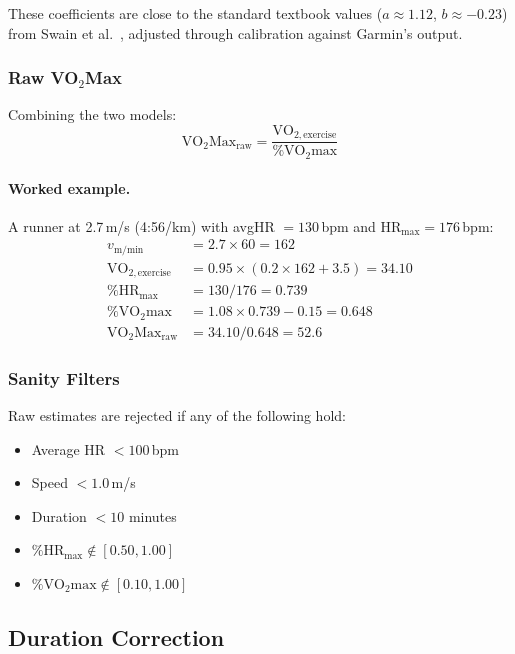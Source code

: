 \documentclass[11pt,a4paper]{article}
\begin{document}
These coefficients are close to the standard textbook values ($a \approx 1.12$, $b \approx -0.23$) from Swain et al.~\cite{swain1994}, adjusted through calibration against Garmin's output.

\subsubsection{Raw VO$_2$Max}

Combining the two models:
\begin{equation}
\text{VO}_2\text{Max}_{\text{raw}} = \frac{\text{VO}_{2,\text{exercise}}}{\%\text{VO}_2\text{max}}
\label{eq:raw-vo2max}
\end{equation}

\paragraph{Worked example.}
A runner at 2.7\,m/s (4:56/km) with avgHR $= 130$\,bpm and HR$_{\text{max}} = 176$\,bpm:
\begin{align*}
v_{\text{m/min}} &= 2.7 \times 60 = 162 \\
\text{VO}_{2,\text{exercise}} &= 0.95 \times (0.2 \times 162 + 3.5) = 34.10 \\
\%\text{HR}_{\text{max}} &= 130 / 176 = 0.739 \\
\%\text{VO}_2\text{max} &= 1.08 \times 0.739 - 0.15 = 0.648 \\
\text{VO}_2\text{Max}_{\text{raw}} &= 34.10 / 0.648 = 52.6
\end{align*}

\subsubsection{Sanity Filters}

Raw estimates are rejected if any of the following hold:
\begin{itemize}[nosep]
    \item Average HR $< 100$\,bpm
    \item Speed $< 1.0$\,m/s
    \item Duration $< 10$ minutes
    \item $\%\text{HR}_{\text{max}} \notin [0.50, 1.00]$
    \item $\%\text{VO}_2\text{max} \notin [0.10, 1.00]$
\end{itemize}


\subsection{Duration Correction}
\label{sec:duration-correction}
\end{document}
